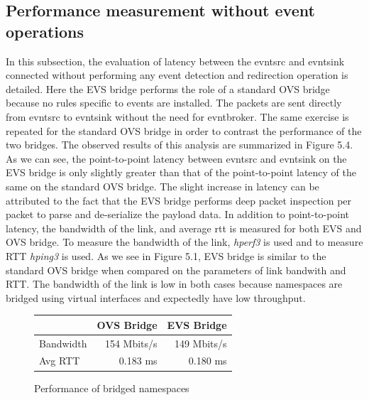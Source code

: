 \subsection{Performance measurement without event operations}
In this subsection, the evaluation of latency between the evntsrc and evntsink connected without performing any event detection and redirection operation is detailed. Here the EVS bridge performs the role of a standard OVS bridge because no rules specific to events are installed. The packets are sent directly from evntsrc to evntsink without the need for evntbroker. The same exercise is repeated for the standard OVS bridge in order to contrast the performance of the two bridges. The observed results of this analysis are summarized in Figure 5.4. As we can see, the point-to-point latency between evntsrc and evntsink on the EVS bridge is only slightly greater than that of the point-to-point latency of the same on the standard OVS bridge. The slight increase in latency can be attributed to the fact that the EVS bridge performs deep packet inspection per packet to parse and de-serialize the payload data. 
\newline
In addition to point-to-point latency, the bandwidth of the link, and average \ac{rtt} is measured for both EVS and OVS bridge. To measure the bandwidth of the link, \textit{hperf3} is used and to measure RTT \textit{hping3} is used. As we see in Figure 5.1, EVS bridge is similar to the standard OVS bridge when compared on the parameters of link bandwith and RTT. The bandwidth of the link is  low in both  cases because namespaces are bridged using virtual interfaces and expectedly have low throughput.
\begin{figure}[H]
\centering
\caption{Performance of bridged namespaces}
\hfill
 \begin{tabular} {lrr}
 \toprule
 \hline
 &  OVS Bridge & EVS Bridge  \\ \midrule
 \hline 
 Bandwidth &  154 Mbits/s & 149 Mbits/s  \\ 
 \hline
 Avg RTT & 0.183 ms & 0.180 ms  \\ \bottomrule
 \hline 
\end{tabular}
\end{figure}


